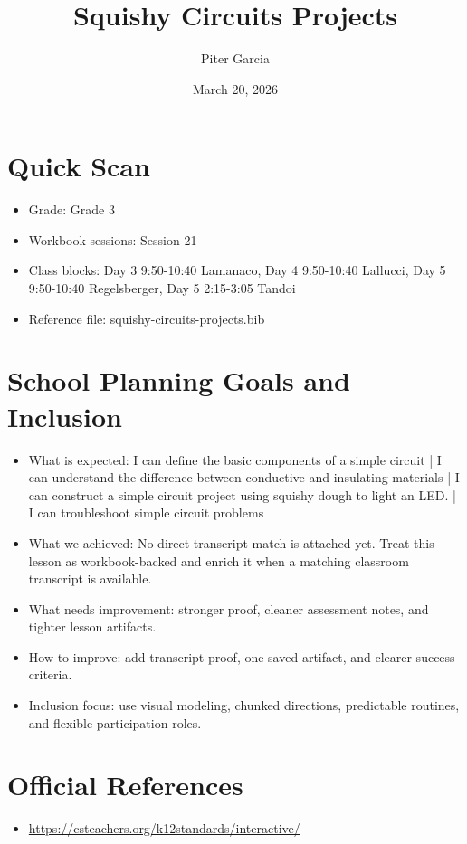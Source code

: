 \documentclass[11pt]{article}
\title{Squishy Circuits Projects}
\author{Piter Garcia}
\date{March 20, 2026}
\begin{document}
\maketitle
\section*{Quick Scan}
\begin{itemize}[leftmargin=*]
\item Grade: Grade 3
\item Workbook sessions: Session 21
\item Class blocks: Day 3 9:50-10:40 Lamanaco, Day 4 9:50-10:40 Lallucci, Day 5 9:50-10:40 Regelsberger, Day 5 2:15-3:05 Tandoi
\item Reference file: squishy-circuits-projects.bib
\end{itemize}
\section*{School Planning Goals and Inclusion}
\begin{itemize}[leftmargin=*]
\item What is expected: I can define the basic components of a simple circuit | I can understand the difference between conductive and insulating materials | I can construct a simple circuit project using squishy dough to light an LED. | I can troubleshoot simple circuit problems
\item What we achieved: No direct transcript match is attached yet. Treat this lesson as workbook-backed and enrich it when a matching classroom transcript is available.
\item What needs improvement: stronger proof, cleaner assessment notes, and tighter lesson artifacts.
\item How to improve: add transcript proof, one saved artifact, and clearer success criteria.
\item Inclusion focus: use visual modeling, chunked directions, predictable routines, and flexible participation roles.
\end{itemize}
\section*{Official References}
\begin{itemize}[leftmargin=*]
\item \url{https://csteachers.org/k12standards/interactive/}

\end{itemize}
\end{document}
